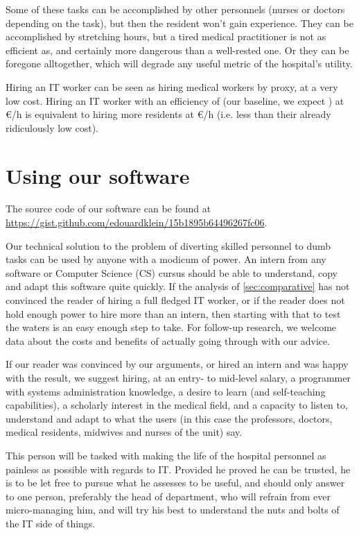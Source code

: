 \documentclass[nobib]{tufte-handout}
\begin{document}
Some of these tasks can be accomplished by other personnels (nurses or doctors depending on the task), but then the resident won't gain experience. They can be accomplished by stretching hours, but a tired medical practitioner is not as efficient as, and certainly more dangerous than a well-rested one. Or they can be foregone alltogether, which will degrade any useful metric of the hospital's utility.

Hiring an IT worker can be seen as hiring medical workers by proxy, at a very low cost. Hiring an IT worker with an efficiency of  (our baseline, we expect ) at  €/h is equivalent to hiring  more residents at  €/h (i.e. less than their already ridiculously low cost).








\section{Using our software}
\label{sec:deployment}

The source code of our software can be found at \url{https://gist.github.com/edouardklein/15b1895b64496267fc06}.

Our technical solution to the problem of diverting skilled personnel to dumb tasks can be used by anyone with a modicum of power.  An intern from any software or Computer Science (CS) cursus should be able to understand, copy and adapt this software quite quickly. If the analysis of \autoref{sec:comparative} has not convinced the reader of hiring a full fledged IT worker, or if the reader does not hold enough power to hire more than an intern, then starting with that to test the waters is an easy enough step to take. For follow-up research, we welcome data about the costs and benefits of actually going through with our advice.

If our reader was convinced by our arguments, or hired an intern and was happy with the result, we suggest  hiring, at an entry- to mid-level salary, a programmer with systems administration knowledge, a desire to learn (and self-teaching capabilities), a scholarly interest in the medical field, and a capacity to listen to, understand and adapt to what the users (in this case the professors, doctors, medical residents, midwives and nurses of the unit) say.

This person will be tasked with making the life of the hospital personnel as painless as possible with regards to IT. Provided he proved he can be trusted, he is to be let free to pursue what he assesses to be useful, and should only answer to one person, preferably the head of department, who will  refrain from ever micro-managing him, and will try his best to understand the nuts and bolts of the IT side of things.
\end{document}
